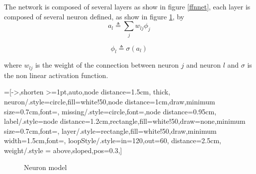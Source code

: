 The network is composed of several layers as show in figure \ref{ffnnet}, each layer is composed of several neuron defined, as show in figure \ref{neuron_model}, by
\begin{equation}
a_l \triangleq \sum_j w_{lj}\phi_j
\end{equation}

\begin{equation}
\phi_l \triangleq \sigma(a_l)
\end{equation}


where $w_{lj}$ is the weight of the connection between neuron $j$ and neuron $l$ and $\sigma$ is the non linear activation function.


=[->,shorten >=1pt,auto,node distance=1.5cm,
  thick,
  neuron/.style={circle,fill=white!50,node distance=1cm,draw,minimum size=0.7cm,font=\sffamily\Large\bfseries},
  missing/.style={circle,font=\sffamily\Large,node distance=0.95cm},
  label/.style={node distance=1.2cm,rectangle,fill=white!50,draw=none,minimum size=0.7cm,font=\sffamily\normalsize},
  layer/.style={rectangle,fill=white!50,draw,minimum width=1.5cm,font=\sffamily\Large},
  loopStyle/.style={in=120,out=60, distance=2.5cm},
  weight/.style = {above,sloped,pos=0.3},]
\begin{figure}[!h]
 \centering
{}
\caption{Neuron model}
\label{neuron_model}
\end{figure}



